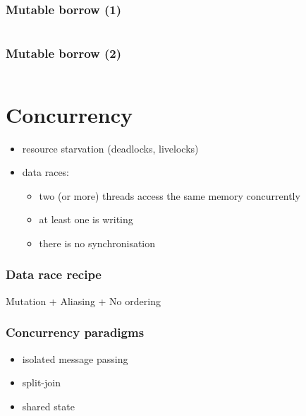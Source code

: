 \documentclass{beamer}
\begin{document}
\begin{frame}
    \frametitle{Mutable borrow (1)}
    \inputminted[fontsize=\scriptsize]{rust}{code/mutable_borrow1.rs}
\end{frame}

\begin{frame}
    \frametitle{Mutable borrow (2)}
    \inputminted[fontsize=\scriptsize]{rust}{code/mutable_borrow2.rs}
\end{frame}

\section{Concurrency}

\begin{frame}
    \begin{itemize}
        \frametitle{Concurrency Pitfalls}
        \item resource starvation (deadlocks, livelocks)
        \item data races:
            \begin{itemize}
                \item two (or more) threads access the same memory concurrently
                \item at least one is writing
                \item there is no synchronisation
            \end{itemize}
    \end{itemize}
\end{frame}

\begin{frame}
    \frametitle{Data race recipe}
    \begin{center}
        Mutation + Aliasing + No ordering
    \end{center}
\end{frame}


\begin{frame}
    \frametitle{Concurrency paradigms}
    \begin{itemize}
        \item isolated message passing
        \item split-join
        \item shared state
    \end{itemize}
\end{frame}
\end{document}

